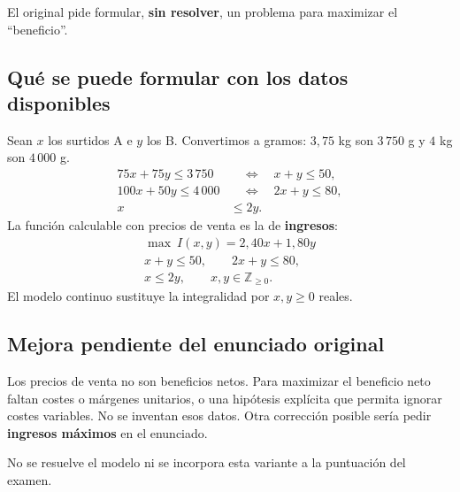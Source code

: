 \documentclass[11pt]{article}
\begin{document}
El original pide formular, \textbf{sin resolver}, un problema para maximizar el ``beneficio''.
\subsection*{Qué se puede formular con los datos disponibles}
Sean $x$ los surtidos A e $y$ los B. Convertimos a gramos: $3{,}75$ kg son $3\,750$ g y $4$ kg son $4\,000$ g.
\begin{align*}
75x+75y\leq3\,750&\quad\Longleftrightarrow\quad x+y\leq50,\\
100x+50y\leq4\,000&\quad\Longleftrightarrow\quad2x+y\leq80,\\
x&\leq2y.
\end{align*}
La función calculable con precios de venta es la de \textbf{ingresos}:
\[
\boxed{\begin{gathered}
\max\ I(x,y)=2{,}40x+1{,}80y\\
x+y\leq50,\qquad2x+y\leq80,\\
x\leq2y,\qquad x,y\in\mathbb Z_{\geq0}.
\end{gathered}}
\]
El modelo continuo sustituye la integralidad por $x,y\geq0$ reales.
\subsection*{Mejora pendiente del enunciado original}
Los precios de venta no son beneficios netos. Para maximizar el beneficio neto faltan costes o márgenes unitarios, o una hipótesis explícita que permita ignorar costes variables. No se inventan esos datos. Otra corrección posible sería pedir \textbf{ingresos máximos} en el enunciado.

No se resuelve el modelo ni se incorpora esta variante a la puntuación del examen.
\end{document}

